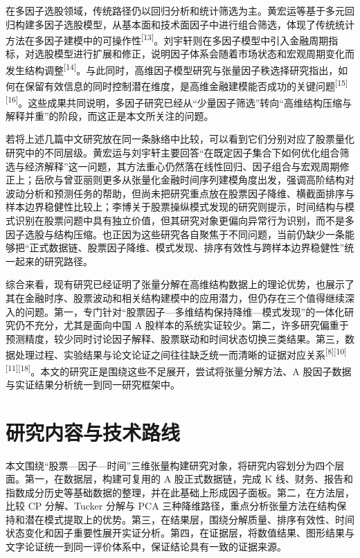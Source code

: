 在多因子选股领域，传统路径仍以回归分析和统计筛选为主。黄宏运等基于多元回归构建多因子选股模型，从基本面和技术面因子中进行组合筛选，体现了传统统计方法在多因子建模中的可操作性\textsuperscript{[13]}。刘宇轩则在多因子模型中引入金融周期指标，对选股模型进行扩展和修正，说明因子体系会随着市场状态和宏观周期变化而发生结构调整\textsuperscript{[14]}。与此同时，高维因子模型研究与张量因子秩选择研究指出，如何在保留有效信息的同时控制潜在维度，是高维金融建模能否成功的关键问题\textsuperscript{[15][16]}。这些成果共同说明，多因子研究已经从“少量因子筛选”转向“高维结构压缩与解释并重”的阶段，而这正是本文所关注的问题。

若将上述几篇中文研究放在同一条脉络中比较，可以看到它们分别对应了股票量化研究中的不同层级。黄宏运与刘宇轩主要回答“在既定因子集合下如何优化组合筛选与经济解释”这一问题，其方法重心仍然落在线性回归、因子组合与宏观周期修正上；岳欣与曾亚丽则更多从张量化金融时间序列建模角度出发，强调高阶结构对波动分析和预测任务的帮助，但尚未把研究重点放在股票因子降维、横截面排序与样本边界稳健性比较上；李博关于股票操纵模式发现的研究则提示，时间结构与模式识别在股票问题中具有独立价值，但其研究对象更偏向异常行为识别，而不是多因子选股与结构压缩。也正因为这些研究各自聚焦于不同问题，当前仍缺少一条能够把“正式数据链、股票因子降维、模式发现、排序有效性与跨样本边界稳健性”统一起来的研究路径。

综合来看，现有研究已经证明了张量分解在高维结构数据上的理论优势，也展示了其在金融时序、股票波动和相关结构建模中的应用潜力，但仍存在三个值得继续深入的问题。第一，专门针对“股票因子—多维结构保持降维—模式发现”的一体化研究仍不充分，尤其是面向中国 A 股样本的系统实证较少。第二，许多研究偏重于预测精度，较少同时讨论因子解释、股票联动和时间状态切换三类结果。第三，数据处理过程、实验结果与论文论证之间往往缺乏统一而清晰的证据对应关系\textsuperscript{[8][10][11][18]}。本文的研究正是围绕这些不足展开，尝试将张量分解方法、A 股因子数据与实证结果分析统一到同一研究框架中。

\section{研究内容与技术路线}

本文围绕“股票—因子—时间”三维张量构建研究对象，将研究内容划分为四个层面。第一，在数据层，构建可复用的 A 股正式数据链，完成 K 线、财务、报告和指数成分历史等基础数据的整理，并在此基础上形成因子面板。第二，在方法层，比较 CP 分解、Tucker 分解与 PCA 三种降维路径，重点分析张量方法在结构保持和潜在模式提取上的优势。第三，在结果层，围绕分解质量、排序有效性、时间状态变化和因子重要性展开实证分析。第四，在证据层，将数值结果、图形结果与文字论证统一到同一评价体系中，保证结论具有一致的证据来源。

